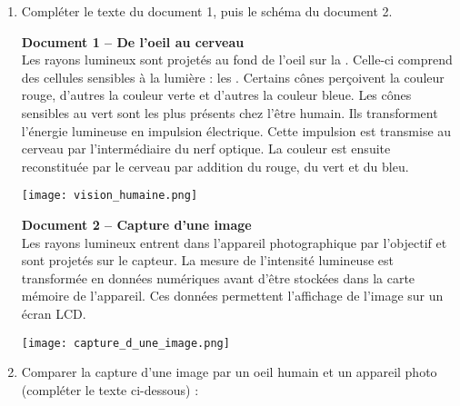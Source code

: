 \documentclass[a4paper]{article}
\newlength{\stextwidth} %
\newcommand{\guess}[1]{\ifthenelse{\boolean{reveal}}{{\color{red}#1}}{\settowidth{\stextwidth}{#1}\makebox[\stextwidth]{\dotfill}}}
\begin{document}
\begin{enumerate}
  \item Compléter le texte du document 1, puis le schéma du document 2.
    \begin{multicols}{2}
      \textbf{Document 1 -- De l'oeil au cerveau}\\
      Les rayons lumineux sont projetés au fond de l'oeil sur la \guess{rétine}. Celle-ci comprend des cellules sensibles à la lumière : les \guess{cônes}. Certains cônes perçoivent la couleur rouge, d'autres la couleur verte et d'autres la couleur bleue. Les cônes sensibles au vert sont les plus présents chez l'être humain. Ils transforment l'énergie lumineuse en impulsion électrique. Cette impulsion est transmise au cerveau par l'intermédiaire du nerf optique. La couleur est ensuite reconstituée par le cerveau par addition du rouge, du vert et du bleu.

      \begin{center}
	\texttt{[image: vision\_humaine.png]}
      \end{center}
    \end{multicols}

    \pagebreak

    \begin{multicols}{2}
      \textbf{Document 2 -- Capture d'une image}\\
      Les rayons lumineux entrent dans l'appareil photographique par l'objectif et sont projetés sur le capteur. La mesure de l'intensité lumineuse est transformée en données numériques avant d'être stockées dans la carte mémoire de l'appareil. Ces données permettent l'affichage de l'image sur un écran LCD.\columnbreak

      \begin{center}
	\texttt{[image: capture\_d\_une\_image.png]}
      \end{center}
    \end{multicols}
  \item Comparer la capture d'une image par un oeil humain et un appareil photo (compléter le texte ci-dessous) :


\end{enumerate}
\end{document}
